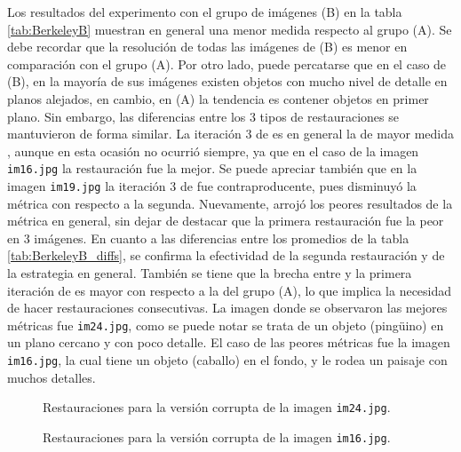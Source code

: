 
Los resultados del experimento con el grupo de im\'agenes (B) en la tabla \ref{tab:BerkeleyB} muestran en general una menor medida \PSNR respecto al grupo (A). Se debe recordar que la resoluci\'on de todas las im\'agenes de (B) es menor en comparaci\'on con el grupo (A). Por otro lado, puede percatarse que en el caso de (B), en la mayor\'ia de sus im\'agenes existen objetos con mucho nivel de detalle en planos alejados, en cambio, en (A) la tendencia es contener objetos en primer plano. Sin embargo, las diferencias entre los 3 tipos de restauraciones se mantuvieron de forma similar. La iteraci\'on 3 de \SOP es en general la de mayor medida \PSNR, aunque en esta ocasión no ocurrió siempre, ya que en el caso de la imagen \texttt{im16.jpg} la restauraci\'on \NS fue la mejor. Se puede apreciar tambi\'en que en la imagen \texttt{im19.jpg} la iteraci\'on 3 de \SOP fue contraproducente, pues disminuy\'o la métrica con respecto a la segunda. Nuevamente, \TELEA arroj\'o los peores resultados de la m\'etrica en general, sin dejar de destacar que la primera restauración \SOP fue la peor en 3 im\'agenes. En cuanto a las diferencias entre los promedios de la tabla \ref{tab:BerkeleyB_diffs}, se confirma la efectividad de la segunda restauraci\'on \SOP y de la estrategia en general. Tambi\'en se tiene que la brecha entre \NS y la primera iteraci\'on de \SOP es mayor con respecto a la del grupo (A), lo que implica la necesidad de hacer restauraciones \SOP consecutivas. La imagen donde se observaron las mejores m\'etricas fue \texttt{im24.jpg}, como se puede notar se trata de un objeto (ping\"uino) en un plano cercano y con poco detalle. El caso de las peores m\'etricas fue la imagen \texttt{im16.jpg}, la cual tiene un objeto (caballo) en el fondo, y le rodea un paisaje con muchos detalles.


\begin{figure}[H]
	\centering
	\caption{Restauraciones para la versi\'on corrupta de la imagen \texttt{im24.jpg}.}
	\label{fig:im24.jpg}
\end{figure}
\begin{figure}[H]
	\centering
	\caption{Restauraciones para la versi\'on corrupta de la imagen \texttt{im16.jpg}.}
	\label{fig:im16.jpg}
\end{figure}

